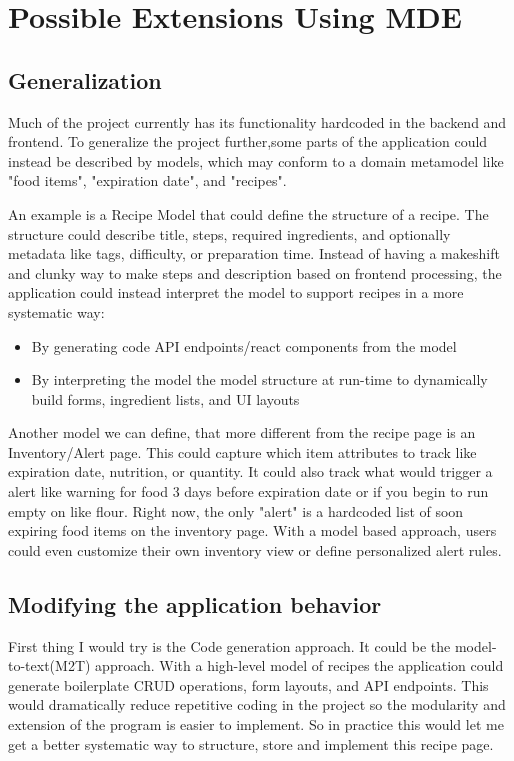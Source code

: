 \section{Possible Extensions Using MDE}
\subsection{Generalization}

Much of the project currently has its functionality hardcoded in the backend and frontend. To generalize the project further,some parts of the application could instead be described by models, which may conform to a domain metamodel like "food items", "expiration date", and "recipes".

An example is a Recipe Model that could define the structure of a recipe. The structure could describe title, steps, required ingredients, and optionally metadata like tags, difficulty, or preparation time. Instead of having a makeshift and clunky way to make steps and description based on frontend processing, the application could instead interpret the model to support recipes in a more systematic way:
\begin{itemize}
    \item By generating code API endpoints/react components from the model
    \item By interpreting the model the model structure at run-time to dynamically build forms, ingredient lists, and UI layouts
\end{itemize}

Another model we can define, that more different from the recipe page is an Inventory/Alert page. This could capture which item attributes to track like expiration date, nutrition, or quantity. It could also track what would trigger a alert like warning for food 3 days before expiration date or if you begin to run empty on like flour. Right now, the only "alert" is a hardcoded list of soon expiring food items on the inventory page. With a model based approach, users could even customize their own inventory view or define personalized alert rules.

\subsection{Modifying the application behavior}

First thing I would try is the Code generation approach. It could be the model-to-text(M2T) approach. With a high-level model of recipes the application could generate boilerplate CRUD operations, form layouts, and API endpoints. This would dramatically reduce repetitive coding in the project so the modularity and extension of the program is easier to implement. So in practice this would let me get a better systematic way to structure, store and implement this recipe page.

